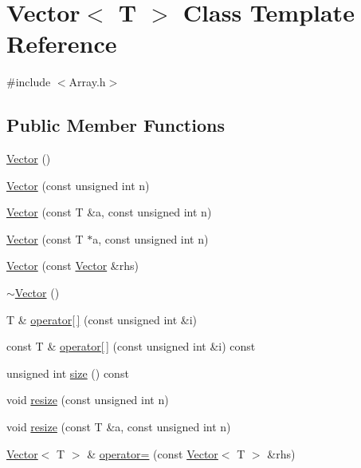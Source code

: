\hypertarget{classVector}{}\section{Vector$<$ T $>$ Class Template Reference}
\label{classVector}


{\ttfamily \#include $<$Array.\+h$>$}

\subsection*{Public Member Functions}
\begin{DoxyCompactItemize}
\item 
\mbox{\hyperlink{classVector_a39d6069675db4ecfc1ab81d440da759a}{Vector}} ()
\item 
\mbox{\hyperlink{classVector_a8575836acd6e8c9a2297b5ba6d14008c}{Vector}} (const unsigned int n)
\item 
\mbox{\hyperlink{classVector_aa2bc8aac00503574bac8302652ef7ba0}{Vector}} (const T \&a, const unsigned int n)
\item 
\mbox{\hyperlink{classVector_a62f06e9931e61437a5a5783eca0a9550}{Vector}} (const T $\ast$a, const unsigned int n)
\item 
\mbox{\hyperlink{classVector_ac71d98c4ac152523a76bbadcd3a83a5a}{Vector}} (const \mbox{\hyperlink{classVector}{Vector}} \&rhs)
\item 
\mbox{\hyperlink{classVector_afd524fac19e6d3d69db5198ffe2952b0}{$\sim$\+Vector}} ()
\item 
T \& \mbox{\hyperlink{classVector_aa07a0c8ca467e2ce190afc26054cf422}{operator\mbox{[}$\,$\mbox{]}}} (const unsigned int \&i)
\item 
const T \& \mbox{\hyperlink{classVector_a36cc881f0270de628bec7a80bbdab741}{operator\mbox{[}$\,$\mbox{]}}} (const unsigned int \&i) const
\item 
unsigned int \mbox{\hyperlink{classVector_a5214a382564aedc712b609416aa3b7b1}{size}} () const
\item 
void \mbox{\hyperlink{classVector_ae751d4bf4c403e4578a9df1202e93f56}{resize}} (const unsigned int n)
\item 
void \mbox{\hyperlink{classVector_a1ff5ed0bca47854450eb78024c6f52ff}{resize}} (const T \&a, const unsigned int n)
\item 
\mbox{\hyperlink{classVector}{Vector}}$<$ T $>$ \& \mbox{\hyperlink{classVector_aa44e8e04a723f2c0bd9382a3bfa46e7c}{operator=}} (const \mbox{\hyperlink{classVector}{Vector}}$<$ T $>$ \&rhs)

\end{DoxyCompactItemize}
